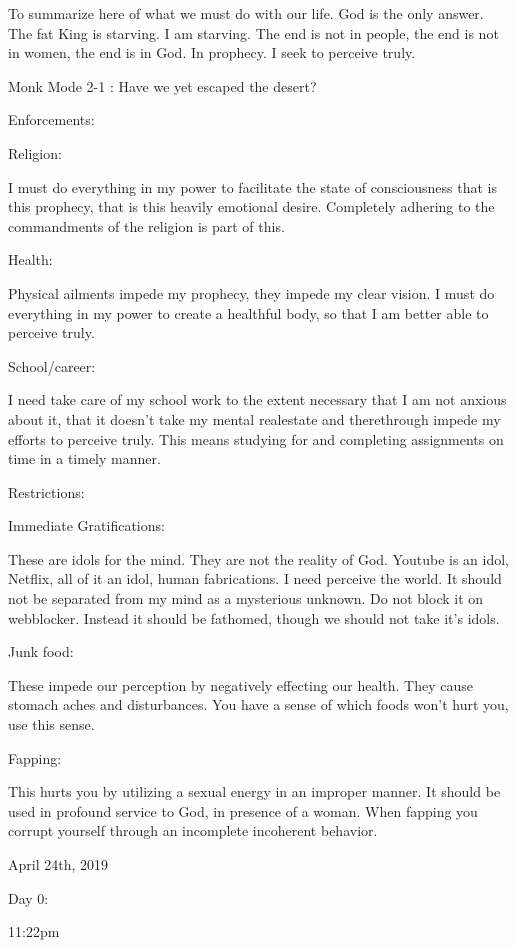 To summarize here of what we must do with our life. God is the only
answer. The fat King is starving. I am starving. The end is not in
people, the end is not in women, the end is in God. In prophecy. I seek
to perceive truly.

Monk Mode 2-1 : Have we yet escaped the desert?

Enforcements:

Religion:

I must do everything in my power to facilitate the state of
consciousness that is this prophecy, that is this heavily emotional
desire. Completely adhering to the commandments of the religion is part
of this.

Health:

Physical ailments impede my prophecy, they impede my clear vision. I
must do everything in my power to create a healthful body, so that I am
better able to perceive truly.

School/career:

I need take care of my school work to the extent necessary that I am not
anxious about it, that it doesn't take my mental realestate and
therethrough impede my efforts to perceive truly. This means studying
for and completing assignments on time in a timely manner.

Restrictions:

Immediate Gratifications:

These are idols for the mind. They are not the reality of God. Youtube
is an idol, Netflix, all of it an idol, human fabrications. I need
perceive the world. It should not be separated from my mind as a
mysterious unknown. Do not block it on webblocker. Instead it should be
fathomed, though we should not take it's idols.

Junk food:

These impede our perception by negatively effecting our health. They
cause stomach aches and disturbances. You have a sense of which foods
won't hurt you, use this sense.

Fapping:

This hurts you by utilizing a sexual energy in an improper manner. It
should be used in profound service to God, in presence of a woman. When
fapping you corrupt yourself through an incomplete incoherent behavior.

\bigskip
\bigskip
April 24th, 2019

Day 0:

11:22pm

